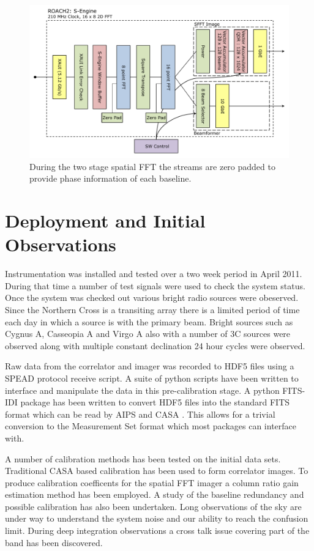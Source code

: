 \documentclass[useAMS,usenatbib,onecolumn]{mn2e}
\begin{document}
\begin{figure}
    \centering
    \includegraphics[scale=0.6]{graphics/crop_sengine_block.pdf}
    \caption{During the two stage spatial FFT the streams are zero padded to provide phase information of each baseline.}
    \label{fig:seng_block}
\end{figure}

\section{Deployment and Initial Observations}

Instrumentation was installed and tested over a two week period in April 2011.
During that time a number of test signals were used to check the system status.
Once the system was checked out various bright radio sources were obeserved.
Since the Northern Cross is a transiting array there is a limited period of time each day in which a source is with the primary beam.
Bright sources such as Cygnus A, Casseopia A and Virgo A also with a number of 3C sources were observed along with multiple constant declination 24 hour cycles were observed.

Raw data from the correlator and imager was recorded to HDF5 files using a SPEAD protocol receive script.
A suite of python scripts have been written to interface and manipulate the data in this pre-calibration stage.
A python FITS-IDI package has been written to convert HDF5 files into the standard FITS format which can be read by AIPS and CASA \citep{}.
This allows for a trivial conversion to the Measurement Set format which most packages can interface with.

A number of calibration methods has been tested on the initial data sets.
Traditional CASA based calibration has been used to form correlator images.
To produce calibration coefficents for the spatial FFT imager a column ratio gain estimation method has been employed.
A study of the baseline redundancy and possible calibration has also been undertaken.
Long observations of the sky are under way to understand the system noise and our ability to reach the confusion limit.
During deep integration observations a cross talk issue covering part of the band has been discovered.
\end{document}
